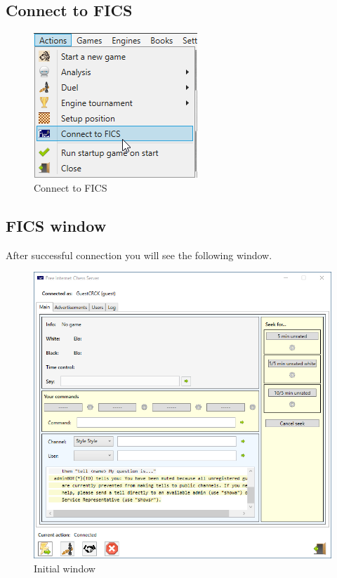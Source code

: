 \documentclass[11pt,a4paper]{article}
\begin{document}
\subsection{Connect to FICS}

\begin{figure}[H]
	\centering
	\includegraphics[scale=1.0]{fics2.png}
	\caption{Connect to FICS}
	\label{fig:fics2}
\end{figure}

\subsection{FICS window}

After successful connection you will see the following window.

\begin{figure}[H]
	\centering
	\includegraphics[scale=0.6]{fics3.png}
	\caption{Initial window}
	\label{fig:fics3}
\end{figure}
\end{document}

